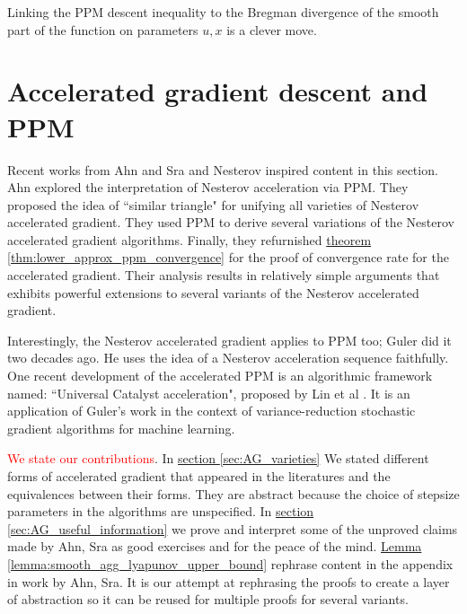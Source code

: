 \documentclass[12pt]{article}
\begin{document}
        \begin{remark}
            Linking the PPM descent inequality to the Bregman divergence of the smooth part of the function on parameters $u, x$ is a clever move. 
        \end{remark}

        
\section{Accelerated gradient descent and PPM}
    Recent works from Ahn and Sra \cite{ahn_understanding_2022} and Nesterov \cite{nesterov_lectures_2018} inspired content in this section.
    Ahn explored the interpretation of Nesterov acceleration via PPM. 
    They proposed the idea of ``similar triangle" for unifying all varieties of Nesterov accelerated gradient. 
    They used PPM to derive several variations of the Nesterov accelerated gradient algorithms. 
    Finally, they refurnished \hyperref[thm:lower_approx_ppm_convergence]{theorem \ref*{thm:lower_approx_ppm_convergence}} for the proof of convergence rate for the accelerated gradient.
    Their analysis results in relatively simple arguments that exhibits powerful extensions to several variants of the Nesterov accelerated gradient. 
    
    \par\noindent
    Interestingly, the Nesterov accelerated gradient applies to PPM too; Guler \cite{guler_new_1992} did it two decades ago. 
    He uses the idea of a Nesterov acceleration sequence faithfully. 
    One recent development of the accelerated PPM is an algorithmic framework named: ``Universal Catalyst acceleration", proposed by Lin et al \cite{lin_universal_2015}. 
    It is an application of Guler's work in the context of variance-reduction stochastic gradient algorithms for machine learning. 
    
    \par\noindent
    \textcolor{red}{We state our contributions}. 
    In \hyperref[sec:AG_varieties]{section \ref*{sec:AG_varieties}} 
    We stated different forms of accelerated gradient that appeared in the literatures and the equivalences between their forms. 
    They are abstract because the choice of stepsize parameters in the algorithms are unspecified. 
    In \hyperref[sec:AG_useful_information]{section \ref*{sec:AG_useful_information}}
    we prove and interpret some of the unproved claims made by Ahn, Sra \cite{ahn_understanding_2022} as good exercises and for the peace of the mind.
    \hyperref[lemma:smooth_agg_lyapunov_upper_bound]{Lemma \ref*{lemma:smooth_agg_lyapunov_upper_bound}} 
    rephrase content in the appendix in work by Ahn, Sra\cite{ahn_understanding_2022}. 
    It is our attempt at rephrasing the proofs to create a layer of abstraction so it can be reused for multiple proofs for several variants. 
\end{document}
